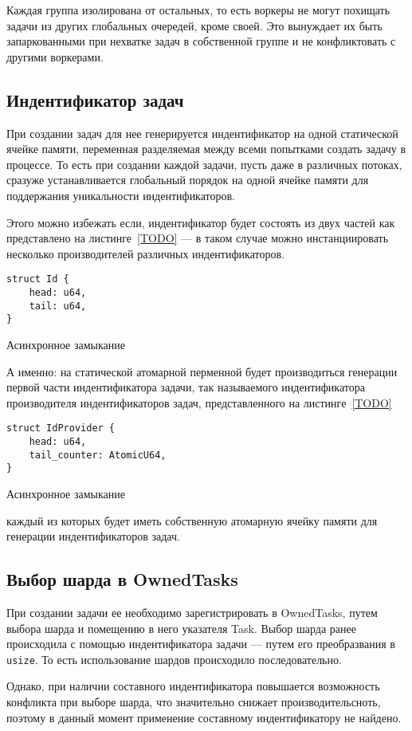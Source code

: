 Каждая группа изолирована от остальных, то есть воркеры не могут похищать задачи из других глобальных очередей, кроме своей. Это вынуждает их быть запаркованными при нехватке задач в собственной группе и не конфликтовать с другими воркерами.

\subsection{Индентификатор задач}

При создании задач для нее генерируется индентификатор на одной статической ячейке памяти, переменная разделяемая между всеми попытками создать задачу в процессе. То есть при создании каждой задачи, пусть даже в различных потоках, сразуже устанавливается глобальный порядок на одной ячейке памяти для поддержания уникальности индентификаторов.

Этого можно избежать если, индентификатор будет состоять из двух частей как представлено на листинге~\ref{TODO} --- в таком случае можно инстанциировать несколько производителей различных индентификаторов.

\begin{listing}[H]
    \begin{verbatim}
struct Id {
    head: u64,
    tail: u64,
}
    \end{verbatim}

    \caption{Асинхронное замыкание}
    \label{listing:async_closure}
\end{listing}

А именно: на статической атомарной перменной будет производиться генерации первой части индентификатора задачи, так называемого индентификатора производителя индентификаторов задач, представленного на листинге~\ref{TODO}

\begin{listing}[H]
    \begin{verbatim}
struct IdProvider {
    head: u64,
    tail_counter: AtomicU64,
}
    \end{verbatim}

    \caption{Асинхронное замыкание}
    \label{listing:async_closure}
\end{listing}

каждый из которых будет иметь собственную атомарную ячейку памяти для генерации индентификаторов задач.

\subsection{Выбор шарда в OwnedTasks}

При создании задачи ее необходимо зарегистрировать в OwnedTasks, путем выбора шарда и помещению в него указателя Task. Выбор шарда ранее происходила с помощью индентификатора задачи --- путем его преобразвания в \verb|usize|. То есть использование шардов происходило последовательно.

Однако, при наличии составного индентификатора повышается возможность конфликта при выборе шарда, что значительно снижает производительсноть, поэтому в данный момент применение составному индентификатору не найдено.
